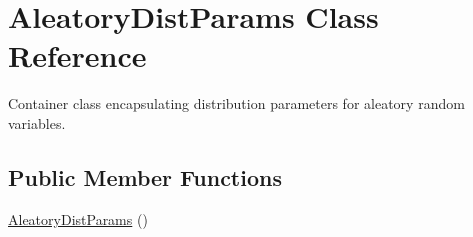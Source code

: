 \section{Aleatory\+Dist\+Params Class Reference}
\label{classPecos_1_1AleatoryDistParams}


Container class encapsulating distribution parameters for aleatory random variables.  


\subsection*{Public Member Functions}
\begin{DoxyCompactItemize}
\item 
\hyperlink{classPecos_1_1AleatoryDistParams_a7039df326db275d7f0c429e71bb95131}{Aleatory\+Dist\+Params} ()\label{classPecos_1_1AleatoryDistParams_a7039df326db275d7f0c429e71bb95131}


\end{DoxyCompactItemize}

